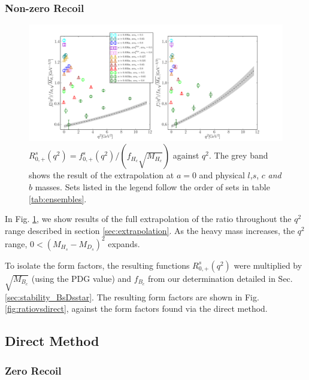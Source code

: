 \subsubsection{Non-zero Recoil}

\begin{figure}[htb!]
  \hspace{-85pt}
  \includegraphics[width=1.40\textwidth]{images/BsDs/ratio/f0fpfHc_vsq2.pdf}
  \caption{ $R_{0,+}^s(q^2) = f_{0,+}^s(q^2)/(f_{H_c}\sqrt{M_{H_c}})$ against $q^2$. The grey band shows the result of the extrapolation at $a=0$ and physical $l$,$s$, $c$ {\it{and}} $b$ masses. Sets listed in the legend follow the order of sets in table \ref{tab:ensembles}. \label{fig:ratiodata}}
\end{figure}

In Fig. \ref{fig:ratiodata}, we show results of the full extrapolation of the ratio throughout the $q^2$ range described in section \ref{sec:extrapolation}. As the heavy mass increases, the $q^2$ range, $0 < (M_{H_s}-M_{D_s})^2$ expands.

To isolate the form factors, the resulting functions $R_{0,+}^s(q^2)$ were multiplied by $\sqrt{M_{B_c}}$ (using the PDG value) and $f_{B_c}$ from our determination detailed in Sec. \ref{sec:stability_BsDsstar}. The resulting form factors are shown in Fig. \ref{fig:ratiovsdirect}, against the form factors found via the direct method.

\subsection{Direct Method}

\subsubsection{Zero Recoil}
\label{sec:directq2max}

